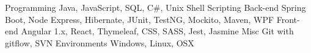 
\begin{cvskills}
    \cvskill
        {Programming}
        {Java, JavaScript, SQL, C\#, Unix Shell Scripting}
    \cvskill
        {Back-end}
        {Spring Boot, Node Express, Hibernate, JUnit, TestNG, Mockito, Maven, WPF}
    \cvskill
        {Front-end}
        {Angular 1.x, React, Thymeleaf, CSS, SASS, Jest, Jasmine}
    \cvskill
        {Misc}
        {Git with gitflow, SVN}
    \cvskill
        {Environments}
        {Windows, Linux, OSX}
\end{cvskills}